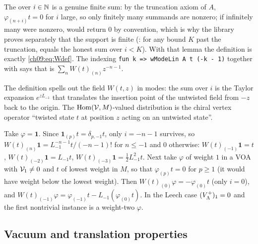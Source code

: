 \begin{dictionary}
The  over $i\in{\mathbb{N}}$ is a genuine finite sum: by the truncation axiom of $A$,
$\varphi_{(n+i)}t=0$ for $i$ large, so only finitely many summands are nonzero; if infinitely many
were nonzero,  would return $0$ by convention, which is why the library proves
separately that the support is finite (: for any bound $K$ past the truncation,
 equals the honest sum over $i<K$). With that lemma the definition is exactly
\eqref{ch09:eq:Wdef}. The indexing \texttt{fun k => wModeLin A t (-k - 1)} together with
 says that  is $\sum_nW(t)_{(n)}z^{-n-1}$.
\end{dictionary}

\begin{physics}
The definition spells out the field $W(t,z)$ in modes: the sum over $i$ is the Taylor expansion $e^{zL_{-1}}$ that translates the insertion point of the untwisted field from $-z$ back to the origin. The $\mathrm{Hom}(\mathcal{V},M)$-valued distribution is the chiral vertex operator ``twisted state $t$ at position $z$ acting on an untwisted state''.
\end{physics}

\begin{example}\label{ch09:ex:lowmodes}
Take $\varphi=\mathbf 1$. Since $\mathbf 1_{(p)}t=\delta_{p,-1}t$, only $i=-n-1$ survives, so
$W(t)_{(n)}\mathbf 1=L_{-1}^{-n-1}t/(-n-1)!$ for $n\le-1$ and $0$ otherwise: $W(t)_{(-1)}\mathbf1=t$,
$W(t)_{(-2)}\mathbf 1=L_{-1}t$, $W(t)_{(-3)}\mathbf 1=\tfrac12L_{-1}^2t$. Next take $\varphi$ of
weight $1$ in a VOA with $\mathcal{V}_1\neq0$ and $t$ of lowest weight in $M$, so that
$\varphi_{(p)}t=0$ for $p\ge1$ (it would have weight below the lowest weight). Then
$W(t)_{(0)}\varphi=-\varphi_{(0)}t$ (only $i=0$), and
$W(t)_{(-1)}\varphi=\varphi_{(-1)}t-L_{-1}(\varphi_{(0)}t)$. In the Leech case $(V_{\Lambda}^{+})_1=0$
and the first nontrivial instance is a weight-two $\varphi$.
\end{example}

\subsection{Vacuum and translation properties}

